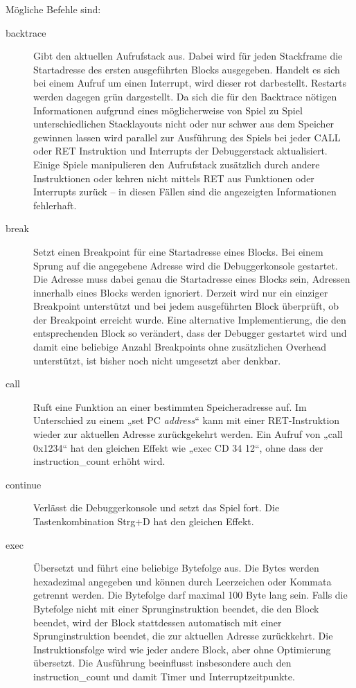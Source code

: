 \documentclass[a4paper]{scrartcl}
\begin{document}
Mögliche Befehle sind:
\begin{description}
\item[backtrace] Gibt den aktuellen Aufrufstack aus. Dabei wird für jeden Stackframe die Startadresse des ersten ausgeführten Blocks ausgegeben. Handelt es sich bei einem Aufruf um einen Interrupt, wird dieser rot darbestellt. Restarts werden dagegen grün dargestellt. Da sich die für den Backtrace nötigen Informationen aufgrund eines möglicherweise von Spiel zu Spiel unterschiedlichen Stacklayouts nicht oder nur schwer aus dem Speicher gewinnen lassen wird parallel zur Ausführung des Spiels bei jeder CALL oder RET Instruktion und Interrupts der Debuggerstack aktualisiert. Einige Spiele manipulieren den Aufrufstack zusätzlich durch andere Instruktionen oder kehren nicht mittels RET aus Funktionen oder Interrupts zurück -- in diesen Fällen sind die angezeigten Informationen fehlerhaft.
\item[break] Setzt einen Breakpoint für eine Startadresse eines Blocks. Bei einem Sprung auf die angegebene Adresse wird die Debuggerkonsole gestartet. Die Adresse muss dabei genau die Startadresse eines Blocks sein, Adressen innerhalb eines Blocks werden ignoriert. Derzeit wird nur ein einziger Breakpoint unterstützt und bei jedem ausgeführten Block überprüft, ob der Breakpoint erreicht wurde. Eine alternative Implementierung, die den entsprechenden Block so verändert, dass der Debugger gestartet wird und damit eine beliebige Anzahl Breakpoints ohne zusätzlichen Overhead unterstützt, ist bisher noch nicht umgesetzt aber denkbar.
\item[call] Ruft eine Funktion an einer bestimmten Speicheradresse auf. Im Unterschied zu einem „set PC \emph{address}“ kann mit einer RET-Instruktion wieder zur aktuellen Adresse zurückgekehrt werden. Ein Aufruf von „call 0x1234“ hat den gleichen Effekt wie „exec CD 34 12“, ohne dass der instruction\_count erhöht wird.
\item[continue] Verlässt die Debuggerkonsole und setzt das Spiel fort. Die Tastenkombination Strg+D hat den gleichen Effekt.
\item[exec] Übersetzt und führt eine beliebige Bytefolge aus. Die Bytes werden hexadezimal angegeben und können durch Leerzeichen oder Kommata getrennt werden. Die Bytefolge darf maximal 100 Byte lang sein. Falls die Bytefolge nicht mit einer Sprunginstruktion beendet, die den Block beendet, wird der Block stattdessen automatisch mit einer Sprunginstruktion beendet, die zur aktuellen Adresse zurückkehrt. Die Instruktionsfolge wird wie jeder andere Block, aber ohne Optimierung übersetzt. Die Ausführung beeinflusst insbesondere auch den instruction\_count und damit Timer und Interruptzeitpunkte.

\end{description}
\end{document}
